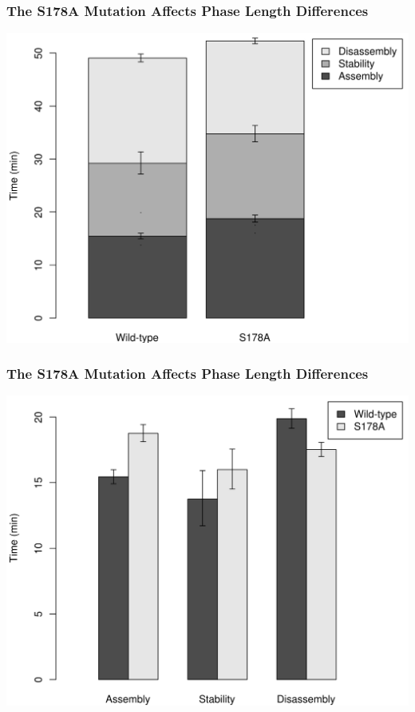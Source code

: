 \documentclass{beamer}
\begin{document}
\begin{frame}
	\frametitle{The S178A Mutation Affects Phase Length Differences}
	\begin{center}
	\includegraphics[height=0.8\textheight]{figures/S178A/adhesion_phase_lifetimes}
	\end{center}
\end{frame}

\begin{frame}
	\frametitle{The S178A Mutation Affects Phase Length Differences}
	\begin{center}
	\includegraphics[height=0.8\textheight]{figures/S178A/adhesion_phase_lifetimes_alt}
	\end{center}
\end{frame}
\end{document}
